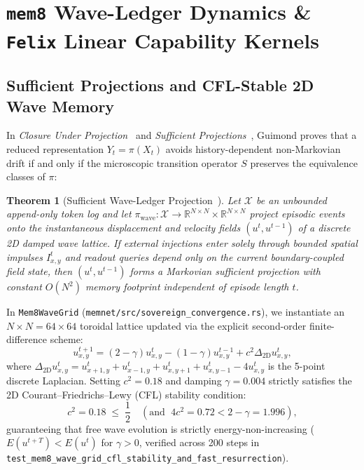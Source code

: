 \documentclass[10pt,twocolumn,letterpaper]{article}
\newtheorem{theorem}{Theorem}
\begin{document}
\section{\texttt{mem8} Wave-Ledger Dynamics \& \texttt{Felix} Linear Capability Kernels}

\subsection{Sufficient Projections and CFL-Stable 2D Wave Memory}
In \emph{Closure Under Projection}~\cite{guimond2026closure} and \emph{Sufficient Projections}~\cite{guimond2026sufficient}, Guimond proves that a reduced representation $Y_t = \pi(X_t)$ avoids history-dependent non-Markovian drift if and only if the microscopic transition operator $S$ preserves the equivalence classes of $\pi$:
\begin{theorem}[Sufficient Wave-Ledger Projection~\cite{guimond2026closure,guimond2026sufficient}]
Let $\mathcal{X}$ be an unbounded append-only token log and let $\pi_{\text{wave}}: \mathcal{X} \to \mathbb{R}^{N\times N} \times \mathbb{R}^{N\times N}$ project episodic events onto the instantaneous displacement and velocity fields $(u^t, u^{t-1})$ of a discrete 2D damped wave lattice. If external injections enter solely through bounded spatial impulses $I_{x,y}^t$ and readout queries depend only on the current boundary-coupled field state, then $(u^t, u^{t-1})$ forms a Markovian sufficient projection with constant $O(N^2)$ memory footprint independent of episode length $t$.
\end{theorem}

In \texttt{Mem8WaveGrid} (\texttt{memnet/src/sovereign\_convergence.rs}), we instantiate an $N\times N = 64\times 64$ toroidal lattice updated via the explicit second-order finite-difference scheme:
\begin{equation}
    u_{x,y}^{t+1} = (2 - \gamma)u_{x,y}^t - (1 - \gamma)u_{x,y}^{t-1} + c^2 \Delta_{\text{2D}} u_{x,y}^t,
\end{equation}
where $\Delta_{\text{2D}} u_{x,y}^t = u_{x+1,y}^t + u_{x-1,y}^t + u_{x,y+1}^t + u_{x,y-1}^t - 4u_{x,y}^t$ is the 5-point discrete Laplacian. Setting $c^2 = 0.18$ and damping $\gamma = 0.004$ strictly satisfies the 2D Courant--Friedrichs--Lewy (CFL) stability condition:
\begin{equation}
    c^2 = 0.18 \;\le\; \frac{1}{2}\quad (\text{and }\; 4c^2 = 0.72 < 2 - \gamma = 1.996),
\end{equation}
guaranteeing that free wave evolution is strictly energy-non-increasing ($E(u^{t+T}) < E(u^t)$ for $\gamma > 0$, verified across 200 steps in \texttt{test\_mem8\_wave\_grid\_cfl\_stability\_and\_fast\_resurrection}).
\end{document}
